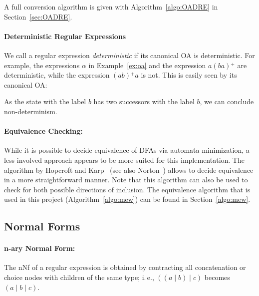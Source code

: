\documentclass[a4paper,11pt, svgnames,titlepage]{article}
\newcommand{\rxp}{{^\mathtt{+}}}
\DeclareMathOperator{\ror}{\mathtt{|}}
\begin{document}
A full conversion algorithm is given with Algorithm~\ref{algo:OADRE} in Section~\ref{sec:OADRE}.

\paragraph{Deterministic Regular Expressions} We call a regular expression \emph{deterministic} if its canonical OA is deterministic. For example, the expressions $\alpha$ in Example~\ref{ex:oa} and the expression $a(ba)\rxp$ are deterministic, while the expression $(ab)\rxp a$ is not. This is easily seen by its canonical OA:
\begin{center}
\end{center}
As the state with the label $b$ has two successors with the label $b$, we can conclude non-determinism. 

\paragraph{Equivalence Checking:} While it is possible to decide equivalence of DFAs via automata minimization, a less involved approach appears to be more suited for this implementation. The algorithm by Hopcroft and Karp~\cite{hop:lin} (see also Norton~\cite{nor:alg}) allows to decide equivalence in a more straightforward manner. Note that this algorithm can also be used to check for both possible directions of inclusion. The equivalence algorithm that is used in this project (Algorithm~\ref{algo:mew}) can be found in Section~\ref{algo:mew}.
\subsection{Normal Forms}
\paragraph{n-ary Normal Form:} The nNf of a regular expression is obtained by contracting all concatenation or choice nodes with children of the same type; i.\,e., $((a\ror b)\ror c)$ becomes $(a \ror b \ror c)$.
\end{document}
